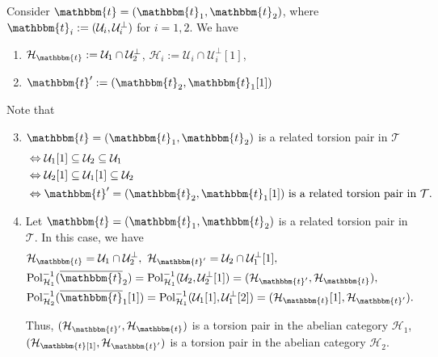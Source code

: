\begin{rmk}
  Consider $\mathbbm{t}=(\mathbbm{t}_1,\mathbbm{t}_2)$, where $\mathbbm{t}_i:=(\mathcal{U}_i,\mathcal{U}_i^\perp)$ for
  $i=1,2$. We have
  \begin{enumerate}
    \item $\mathcal{H}_\mathbbm{t}:=\mathcal{U}_1\cap\mathcal{U}_2^\perp$,
      $\mathcal{H}_i:=\mathcal{U}_i\cap\mathcal{U}_i^\perp[1]$,
    \item $\mathbbm{t}' :=(\mathbbm{t}_2,\mathbbm{t}_1[1])$
  \end{enumerate}

  Note that
  \begin{enumerate}
    \setcounter{enumi}{2}
    \item $\mathbbm{t}=(\mathbbm{t}_1,\mathbbm{t}_2)$ is a related torsion pair in $\mathcal{T}$
      \begin{align*}
        &\Leftrightarrow \mathcal{U}_1[1]\subseteq\mathcal{U}_2\subseteq\mathcal{U}_1\\
        &\Leftrightarrow \mathcal{U}_2[1]\subseteq\mathcal{U}_1[1]\subseteq\mathcal{U}_2\\
        &\Leftrightarrow \mathbbm{t}'=(\mathbbm{t}_2,\mathbbm{t}_1[1]) \text{ is a related torsion pair in }\mathcal{T}.
      \end{align*}
    \item Let $\mathbbm{t}=(\mathbbm{t}_1,\mathbbm{t}_2)$ is a related torsion pair in $\mathcal{T}$. In
      this case, we have
      \begin{align*}
        &\mathcal{H}_\mathbbm{t} = \mathcal{U}_1\cap\mathcal{U}_2^\perp,~
        \mathcal{H}_{\mathbbm{t}'}=\mathcal{U}_2\cap \mathcal{U}_1^\perp[1],\\
        & \mathrm{Pol}_{\mathcal{H}_1}^{-1}(\overline{\mathbbm{t}}_2)=
        \mathrm{Pol}_{\mathcal{H}_1}^{-1}(\mathcal{U}_2,\mathcal{U}_2^\perp[1])=
        (\mathcal{H}_{\mathbbm{t}'},\mathcal{H}_{\mathbbm{t}}),\\
        &\mathrm{Pol}_{\mathcal{H}_2}^{-1}(\overline{\mathbbm{t}}_1[1])=
        \mathrm{Pol}_{\mathcal{H}_1}^{-1}(\mathcal{U}_1[1],\mathcal{U}_1^\perp[2])=
        (\mathcal{H}_{\mathbbm{t}}[1],\mathcal{H}_{\mathbbm{t}'}).
      \end{align*}

      Thus, $(\mathcal{H}_{\mathbbm{t}'},\mathcal{H}_\mathbbm{t})$ is a torsion pair in the abelian
      category $\mathcal{H}_1$,
      $(\mathcal{H}_\mathbbm{t}[1],\mathcal{H}_{\mathbbm{t}'})$ is a torsion pair in the abelian category
      $\mathcal{H}_2$.
  \end{enumerate}
\end{rmk}

